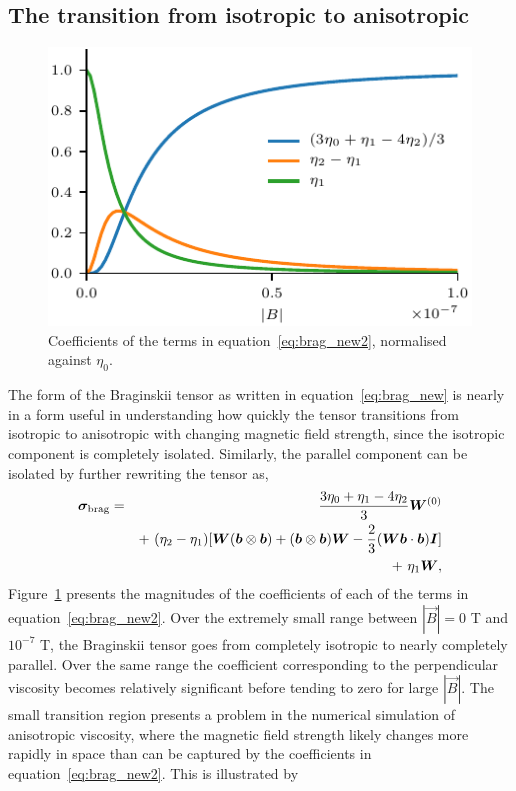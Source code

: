 \subsection{The transition from isotropic to anisotropic}

\begin{figure}[t]
  \centering
  \includegraphics[width=0.5\linewidth]{brag_coeffs_2.pdf}
  \caption{Coefficients of the terms in equation~\ref{eq:brag_new2}, normalised against $\eta_0$.}%
  \label{fig:brag_coeffs2}
\end{figure}

The form of the Braginskii tensor as written in equation~\ref{eq:brag_new} is nearly in a form useful in understanding how quickly the tensor transitions from isotropic to anisotropic with changing magnetic field strength, since the isotropic component is completely isolated. Similarly, the parallel component can be isolated by further rewriting the tensor as,
\begin{eqnarray}\label{eq:brag_new2}
\ten{\sigma}_{\rm brag} = &&\frac{3\eta_0+\eta_1-4\eta_2}{3}\ten{W}^{(0)}\\%
\nonumber
& &+~ (\eta_2-\eta_1)[\ten{W}(\vec{b}\otimes\vec{b})+(\vec{b}\otimes\vec{b})\ten{W} - \frac{2}{3}(\ten{W}\vec{b}\cdot\vec{b})\ten{I}] \\%
\nonumber
& &+~ \eta_1\ten{W},%
\end{eqnarray}
Figure~\ref{fig:brag_coeffs2} presents the magnitudes of the coefficients of each of the terms in equation~\ref{eq:brag_new2}. Over the extremely small range between $|\vec{B}| = 0$ T and $10^{-7}$ T, the Braginskii tensor goes from completely isotropic to nearly completely parallel. Over the same range the coefficient corresponding to the perpendicular viscosity becomes relatively significant before tending to zero for large $|\vec{B}|$. The small transition region presents a problem in the numerical simulation of anisotropic viscosity, where the magnetic field strength likely changes more rapidly in space than can be captured by the coefficients in equation~\ref{eq:brag_new2}. This is illustrated by 

